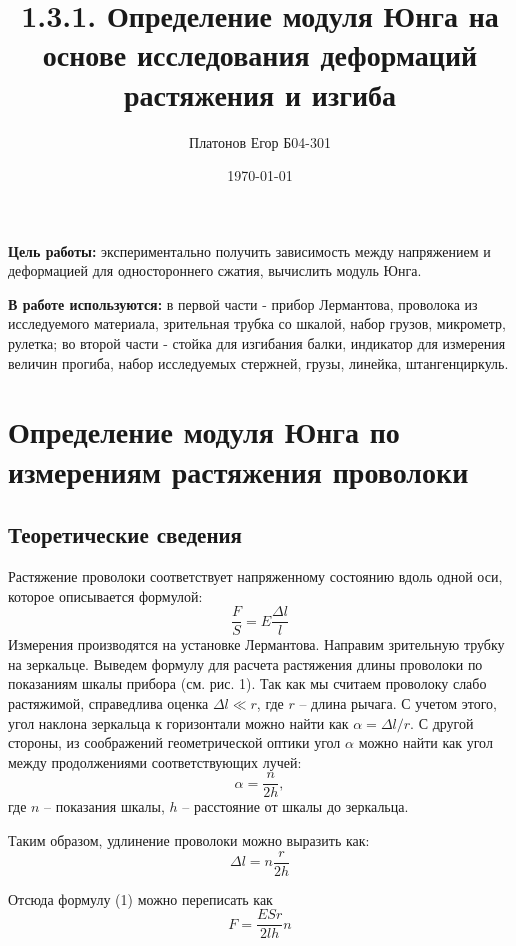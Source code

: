 \documentclass[a4paper, 12pt]{article}
\title{1.3.1. Определение модуля Юнга на основе исследования деформаций растяжения и изгиба}
\author{Платонов Егор Б04-301}
\date{\today}
\begin{document}
\maketitle

\textbf{Цель работы:} экспериментально получить зависимость между напряжением и деформацией для одностороннего сжатия, вычислить модуль Юнга.

\textbf{В работе используются:} в первой части - прибор Лермантова, проволока
    из исследуемого материала,
     зрительная трубка со шкалой,
    набор грузов, микрометр, рулетка;  во второй части - стойка для изгибания балки, индикатор для
    измерения величин прогиба,
набор исследуемых стержней, грузы, линейка, штангенциркуль.

\section{Определение модуля Юнга по измерениям растяжения проволоки}
    \subsection{Теоретические сведения}
    Растяжение проволоки соответствует напряженному состоянию вдоль одной оси, которое описывается формулой:
\begin{equation}
    \frac{F}{S} = E \frac{\Delta l}{l}
    \label{lermantov}
\end{equation}
Измерения производятся на установке Лермантова.
    Направим зрительную трубку на зеркальце.
    Выведем формулу для расчета растяжения длины проволоки по показаниям шкалы
    прибора (см. рис. 1).
    Так как мы считаем проволоку слабо растяжимой, справедлива оценка $\Delta l \ll r$, где
    $r$ -- длина рычага. С учетом этого, угол наклона зеркальца к горизонтали можно
    найти как $\alpha = \Delta l/r$. С другой стороны, из соображений геометрической оптики
    угол $\alpha$ можно найти как угол между продолжениями соответствующих лучей:
    \begin{equation}
        \alpha = \frac{n}{2h},
    \end{equation}
    где $n$ -- показания шкалы, $h$ -- расстояние от шкалы до
    зеркальца.
    \par Таким образом, удлинение проволоки можно выразить как:
    \begin{equation}
        \Delta l = n\frac{r}{2h}
        \label{dlina}
    \end{equation}

    Отсюда формулу (1) можно переписать как
    \begin{equation}
        F = \frac{ESr}{2lh}n
    \end{equation}
\end{document}
